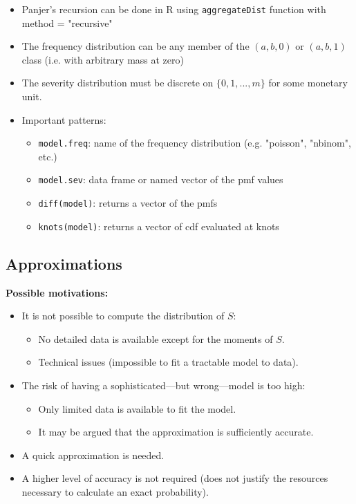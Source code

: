 \documentclass{article}
\begin{document}
\begin{itemize}
    \item Panjer's recursion can be done in R using \texttt{aggregateDist} function with method = "recursive"
    \item The frequency distribution can be any member of the $(a,b,0)$ or $(a,b,1)$ class (i.e. with arbitrary mass at zero)
    \item The severity distribution must be discrete on $\{0,1,...,m\}$ for some monetary unit.
    \item Important patterns:
    \begin{itemize}
        \item \texttt{model.freq}: name of the frequency distribution (e.g. "poisson", "nbinom", etc.)
        \item \texttt{model.sev}: data frame or named vector of the pmf values
        \item \texttt{diff(model)}: returns a vector of the pmfs
        \item \texttt{knots(model)}: returns a vector of cdf evaluated at knots
    \end{itemize}
\end{itemize}



\pagebreak

\subsection{Approximations}

\textbf{Possible motivations:}
\begin{itemize}
  \item It is not possible to compute the distribution of \(S\):
    \begin{itemize}
      \item No detailed data is available except for the moments of \(S\).
      \item Technical issues (impossible to fit a tractable model to data).
    \end{itemize}
  \item The risk of having a sophisticated—but wrong—model is too high:
    \begin{itemize}
      \item Only limited data is available to fit the model.
      \item It may be argued that the approximation is sufficiently accurate.
    \end{itemize}
  \item A quick approximation is needed.
  \item A higher level of accuracy is not required (does not justify the resources
        necessary to calculate an exact probability).
\end{itemize}
\end{document}
